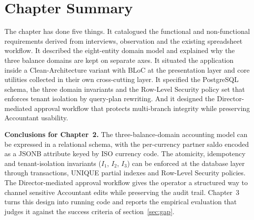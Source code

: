 \section{Chapter Summary}
\label{sec:ch2summary}

The chapter has done five things. It catalogued the functional and non-functional requirements derived from interviews, observation and the existing spreadsheet workflow. It described the eight-entity domain model and explained why the three balance domains are kept on separate axes. It situated the application inside a Clean-Architecture variant with BLoC at the presentation layer and core utilities collected in their own cross-cutting layer. It specified the PostgreSQL schema, the three domain invariants and the Row-Level Security policy set that enforces tenant isolation by query-plan rewriting. And it designed the Director-mediated approval workflow that protects multi-branch integrity while preserving Accountant usability.

\noindent\textbf{Conclusions for Chapter~2.}
The three-balance-domain accounting model can be expressed in a relational schema, with the per-currency partner saldo encoded as a JSONB attribute keyed by ISO currency code. The atomicity, idempotency and tenant-isolation invariants ($I_1$, $I_2$, $I_3$) can be enforced at the database layer through transactions, UNIQUE partial indexes and Row-Level Security policies. The Director-mediated approval workflow gives the operator a structured way to channel sensitive Accountant edits while preserving the audit trail. Chapter~3 turns this design into running code and reports the empirical evaluation that judges it against the success criteria of section~\ref{sec:gap}.
